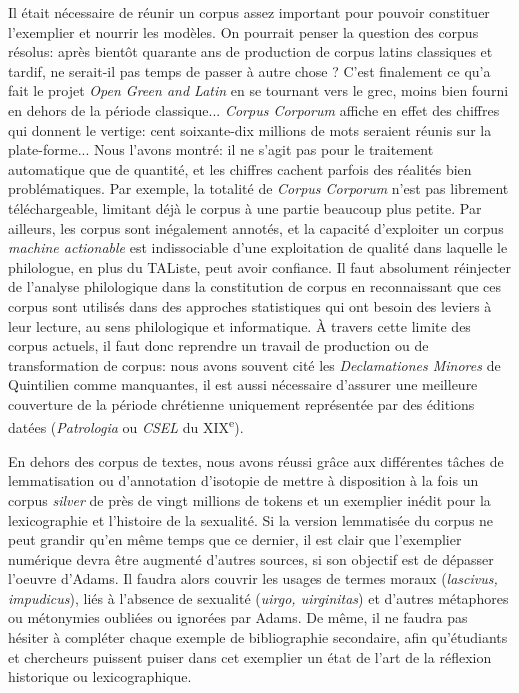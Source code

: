 Il était nécessaire de réunir un corpus assez important pour pouvoir constituer l'exemplier et nourrir les modèles. On pourrait penser la question des corpus résolus: après bientôt quarante ans de production de corpus latins classiques et tardif, ne serait-il pas temps de passer à autre chose ? C'est finalement ce qu'a fait le projet \textit{Open Green and Latin} en se tournant vers le grec, moins bien fourni en dehors de la période classique... \textit{Corpus Corporum} affiche en effet des chiffres qui donnent le vertige: cent soixante-dix millions de mots seraient réunis sur la plate-forme... Nous l'avons montré: il ne s'agit pas pour le traitement automatique que de quantité, et les chiffres cachent parfois des réalités bien problématiques. Par exemple, la totalité de \textit{Corpus Corporum} n'est pas librement téléchargeable, limitant déjà le corpus à une partie beaucoup plus petite. Par ailleurs, les corpus sont inégalement annotés, et la capacité d'exploiter un corpus \textit{machine actionable} est indissociable d'une exploitation de qualité dans laquelle le philologue, en plus du TAListe, peut avoir confiance. Il faut absolument réinjecter de l'analyse philologique dans la constitution de corpus en reconnaissant que ces corpus sont utilisés dans des approches statistiques qui ont besoin des leviers à leur lecture, au sens philologique et informatique. À travers cette limite des corpus actuels, il faut donc reprendre un travail de production ou de transformation de corpus: nous avons souvent cité les \textit{Declamationes Minores} de Quintilien comme manquantes, il est aussi nécessaire d'assurer une meilleure couverture de la période chrétienne uniquement représentée par des éditions datées (\textit{Patrologia} ou \textit{CSEL} du XIX\textsuperscript{e}). 

En dehors des corpus de textes, nous avons réussi grâce aux différentes tâches de lemmatisation ou d'annotation d'isotopie de mettre à disposition à la fois un corpus \textit{silver} de près de vingt millions de tokens et un exemplier inédit pour la lexicographie et l'histoire de la sexualité. Si la version lemmatisée du corpus ne peut grandir qu'en même temps que ce dernier, il est clair que l'exemplier numérique devra être augmenté d'autres sources, si son objectif est de dépasser l'oeuvre d'Adams. Il faudra alors couvrir les usages de termes moraux (\textit{lascivus, impudicus}), liés à l'absence de sexualité (\textit{uirgo, uirginitas}) et d'autres métaphores ou métonymies oubliées ou ignorées par Adams. De même, il ne faudra pas hésiter à compléter chaque exemple de bibliographie secondaire, afin qu'étudiants et chercheurs puissent puiser dans cet exemplier un état de l'art de la réflexion historique ou lexicographique.

